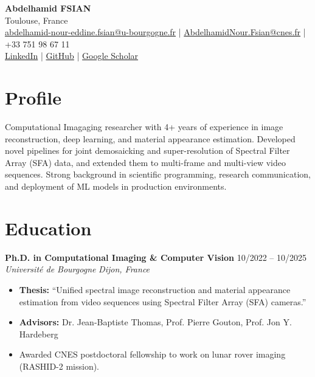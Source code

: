 \documentclass[a4paper,11pt]{article}
\newcommand{\experienceheader}[4]{
    \noindent \textbf{#1} \hfill #2 \\
    \textit{#3} \hfill \textit{#4} \vspace{2pt}
}
\begin{document}
\begin{center}
    {\Huge \textbf{Abdelhamid FSIAN}} \\ \vspace{5pt}
    Toulouse, France \\
    \href{mailto:abdelhamid-nour-eddine.fsian@u-bourgogne.fr}{abdelhamid-nour-eddine.fsian@u-bourgogne.fr} | \href{mailto:AbdelhamidNour.Fsian@cnes.fr}{AbdelhamidNour.Fsian@cnes.fr} | +33 751 98 67 11\\
    \href{https://www.linkedin.com/in/hamid-fsian-abb669161/}{LinkedIn} | \href{https://github.com/HamidFsian}{GitHub} |
    \href{https://scholar.google.com/citations?user=KpIs5bQAAAAJ&hl=fr&oi=sra}{Google Scholar}
\end{center}

\vspace{10pt}

\section{Profile}
\noindent Computational Imagaging researcher with 4+ years of experience in image reconstruction, deep learning, and material appearance estimation. Developed novel pipelines for joint demosaicking and super-resolution of Spectral Filter Array (SFA) data, and extended them to multi-frame and multi-view video sequences. Strong background in scientific programming, research communication, and deployment of ML models in production environments.

\section{Education}

\experienceheader{Ph.D. in Computational Imaging \& Computer Vision}{10/2022 -- 10/2025 }{Université de Bourgogne }{Dijon, France}
\begin{itemize}
    \item \textbf{Thesis:} ``Unified spectral image reconstruction and material appearance estimation from video sequences using Spectral Filter Array (SFA) cameras.''
    \item \textbf{Advisors:} Dr. Jean-Baptiste Thomas, Prof. Pierre Gouton, Prof. Jon Y. Hardeberg
    \item Awarded CNES postdoctoral fellowship to work on lunar rover imaging (RASHID-2 mission).
\end{itemize}
\vspace{8pt}
\end{document}
